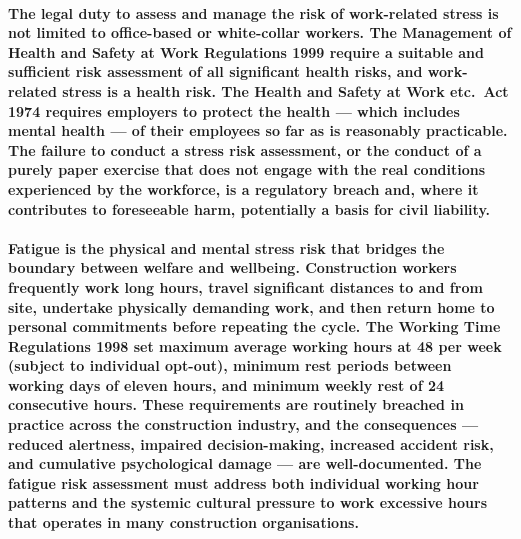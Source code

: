 \paragraph{The legal duty to assess and manage the risk of work-related stress is not limited to office-based or white-collar workers. The Management of Health and Safety at Work Regulations 1999 require a suitable and sufficient risk assessment of all significant health risks, and work-related stress is a health risk. The Health and Safety at Work etc.\ Act 1974 requires employers to protect the health --- which includes mental health --- of their employees so far as is reasonably practicable. The failure to conduct a stress risk assessment, or the conduct of a purely paper exercise that does not engage with the real conditions experienced by the workforce, is a regulatory breach and, where it contributes to foreseeable harm, potentially a basis for civil liability.}

\paragraph{Fatigue is the physical and mental stress risk that bridges the boundary between welfare and wellbeing. Construction workers frequently work long hours, travel significant distances to and from site, undertake physically demanding work, and then return home to personal commitments before repeating the cycle. The Working Time Regulations 1998 set maximum average working hours at 48 per week (subject to individual opt-out), minimum rest periods between working days of eleven hours, and minimum weekly rest of 24 consecutive hours. These requirements are routinely breached in practice across the construction industry, and the consequences --- reduced alertness, impaired decision-making, increased accident risk, and cumulative psychological damage --- are well-documented. The fatigue risk assessment must address both individual working hour patterns and the systemic cultural pressure to work excessive hours that operates in many construction organisations.}


